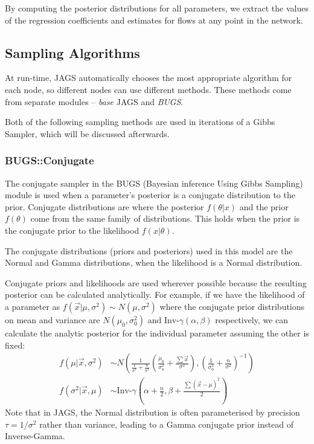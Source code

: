\documentclass[a4paper, 12pt]{article}
\begin{document}
By computing the posterior distributions for all parameters, we extract the values of the regression coefficients and estimates for flows at any point in the network.

\subsection{Sampling Algorithms}
At run-time, JAGS automatically chooses the most appropriate algorithm for each node, so different nodes can use different methods. These methods come from separate modules -- \emph{base} JAGS and \emph{BUGS}.

Both of the following sampling methods are used in iterations of a Gibbs Sampler, which will be discussed afterwards.

\subsubsection{BUGS::Conjugate}
The conjugate sampler in the BUGS (Bayesian inference Using Gibbs Sampling) module is used when a parameter's posterior is a conjugate distribution to the prior. Conjugate distributions are where the posterior $f(\theta|x)$ and the prior $f(\theta)$ come from the same family of distributions. This holds when the prior is the conjugate prior to the likelihood $f(x|\theta)$.

The conjugate distributions (priors and posteriors) used in this model are the Normal and Gamma distributions, when the likelihood is a Normal distribution.

Conjugate priors and likelihoods are used wherever possible because the resulting posterior can be calculated analytically. For example, if we have the likelihood of a parameter as $f(\vec{x}|\mu,\sigma^2)\sim N(\mu,\sigma^2)$ where the conjugate prior distributions on mean and variance are $N(\mu_0,\sigma^2_0)$ and $\text{Inv-}\gamma(\alpha,\beta)$ respectively, we can calculate the analytic posterior for the individual parameter assuming the other is fixed:
\begin{align}
f(\mu|\vec{x},\sigma^2) &\sim N\left( \frac{1}{\frac{1}{\sigma^2} + \frac{n}{\sigma^2}} \left( \frac{\mu_0}{\sigma^2_0} + \frac{\sum\vec{x}}{\sigma^2} \right) , \left( \frac{1}{\sigma^2_0} + \frac{n}{\sigma^2} \right)^{-1} \right)\\
f(\sigma^2|\vec{x},\mu) &\sim \text{Inv-}\gamma \left( \alpha+\frac{n}{2} , \beta+\frac{\sum(\vec{x}-\mu)^2}{2} \right)
\end{align}
Note that in JAGS, the Normal distribution is often parameterised by precision $\tau = 1/\sigma^2$ rather than variance, leading to a Gamma conjugate prior instead of Inverse-Gamma.
\end{document}
